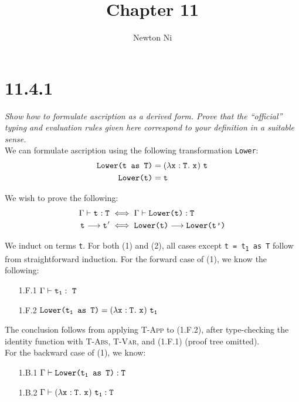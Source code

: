 \documentclass{article}
\title{Chapter 11}
\author{Newton Ni}
\newcommand{\term}[1]{\texttt{t\textsubscript{#1}}}
\newcommand{\ty}[1]{\texttt{T\textsubscript{#1}}}
\newcommand{\var}[1]{\texttt{x\textsubscript{#1}}}
\renewcommand{\ss}[2]{#1 \longrightarrow #2}
\newcommand{\ms}[1]{\texttt{#1}}
\theoremstyle{remark}
\begin{document}
\maketitle

\section{11.4.1}

    \textit{Show how to formulate ascription as a derived form. Prove that the ``official'' typing}
    \textit{and evaluation rules given here correspond to your definition in a suitable sense.} \\

    We can formulate ascription using the following transformation \ms{Lower}:
    \begin{align*}
        \ms{Lower(t as T)} &= (\lambda \var{} : \ty{}.\ \var{})\ \term{} \\
        \ms{Lower(t)} &= \term{}
    \end{align*}

    We wish to prove the following:
    \begin{align}
        \Gamma \vdash \term{} : \ty{} &\iff \Gamma \vdash \ms{Lower(t)} : \ty{} \\
        \ss{\term{}}{\term{}'} &\iff \ss{\ms{Lower(t)}}{\ms{Lower(\term{}')}}
    \end{align}

    We induct on terms \term{}. For both (1) and (2), all cases except \ms{t = \term{1} as T}
    follow from straightforward induction. For the forward case of (1), we know the following:

    \begin{enumerate}
        \item[1.F.1] $\Gamma \vdash \term{1} :\ \ty{}$
        \item[1.F.2] $\ms{Lower(\term{1} as T)} = (\lambda \var{} : \ty{}.\ \var{})\ \term{1}$
    \end{enumerate}

    The conclusion follows from applying \textsc{T-App} to (1.F.2), after type-checking
    the identity function with \textsc{T-Abs}, \textsc{T-Var}, and (1.F.1) (proof tree omitted). \\

    For the backward case of (1), we know:
    \begin{enumerate}
        \item[1.B.1] $\Gamma \vdash \ms{Lower(\term{1} as T)} : \ty{}$
        \item[1.B.2] $\Gamma \vdash (\lambda \var{} : \ty{}.\ \var{})\ \term{1} : \ty{}$
    \end{enumerate}
\end{document}

